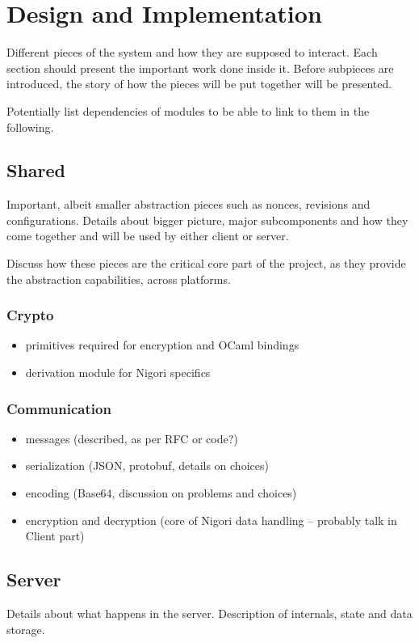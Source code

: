 \chapter{Design and Implementation}
Different pieces of the system and how they are supposed to interact.
Each section should present the important work done inside it.
Before subpieces are introduced, the story of how the pieces will be put together will be presented.

Potentially list dependencies of modules to be able to link to them in the following.

\section{Shared}
Important, albeit smaller abstraction pieces such as nonces, revisions and configurations.
Details about bigger picture, major subcomponents and how they come together and will be used by either client or server.

Discuss how these pieces are the critical core part of the project, as they provide the abstraction capabilities, across platforms.

\subsection{Crypto}
\begin{itemize}
  \item primitives required for encryption and OCaml bindings
  \item derivation module for Nigori specifics
\end{itemize}

\subsection{Communication}
\begin{itemize}
  \item messages (described, as per RFC or code?)
  \item serialization (JSON, protobuf, details on choices)
  \item encoding (Base64, discussion on problems and choices)
  \item encryption and decryption (core of Nigori data handling -- probably talk in Client part)
\end{itemize}

\section{Server}
Details about what happens in the server.
Description of internals, state and data storage.

